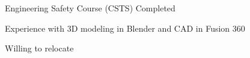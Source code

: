 \section*{}
{\raggedright
\begin{tabitemize}
    \item Engineering Safety Course (CSTS) Completed
    \item Experience with 3D modeling in Blender and CAD in Fusion 360
    \item Willing to relocate
\end{tabitemize}
}

